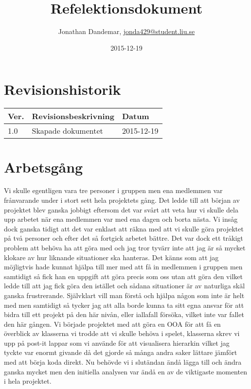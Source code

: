 \documentclass{TDP003mall}
\author{Jonathan Dandemar, \url{jonda429@student.liu.se}\\
 }
\title{Refelektionsdokument}
\date{2015-12-19}
\begin{document}
\projectpage
\section*{Revisionshistorik}
\begin{table}[!h]
\begin{tabularx}{\linewidth}{|l|X|l|}
\hline
Ver. & Revisionsbeskrivning & Datum \\\hline
1.0 & Skapade dokumentet & 2015-12-19 \\\hline
\end{tabularx}
\end{table}

\newpage

\section{Arbetsgång}
Vi skulle egentligen vara tre personer i gruppen men ena medlemmen var frånvarande under i stort sett hela projektets gång.
Det ledde till att början av projektet blev ganska jobbigt eftersom det var svårt att veta hur vi skulle dela upp arbetet
när ena medlemmen var med ena dagen och borta nästa. Vi insåg dock ganska tidigt att det var enklast att räkna med att vi 
skulle göra projektet på två personer och efter det så fortgick arbetet bättre. Det var dock ett tråkigt problem att behöva ha 
att göra med och jag tror tyvärr inte att jag är så mycket klokare av hur liknande situationer ska hanteras. Det känns som att
jag möjligtvis hade kunnat hjälpa till mer med att få in medlemmen i gruppen men samtidigt så fick han en uppgift att göra precis 
som oss utan att göra den vilket ledde till att jag fick göra den istället och sådana situationer är av naturliga skäl ganska
frustrerande. Självklart vill man förstå och hjälpa någon som inte är helt med men samtidigt så tycker jag att alla borde kunna 
ta sitt egna ansvar för att bidra till ett projekt på den här nivån, eller iallafall försöka, vilket inte var fallet den här gången. \newline \newline 
Vi började projektet med att göra en OOA för att få en överblick av klasserna vi trodde att vi skulle behöva i spelet, klasserna 
skrev vi upp på post-it lappar som vi använde för att visualisera hierarkin vilket jag tyckte var enormt givande då det gjorde
så många andra saker lättare jämfört med att börja koda direkt. Nu behövde vi i slutändan ändå lägga till och ändra ganska mycket
men den initiella analysen var ändå en av de viktigaste momenten i hela projektet. \newline \newline 
\end{document}
